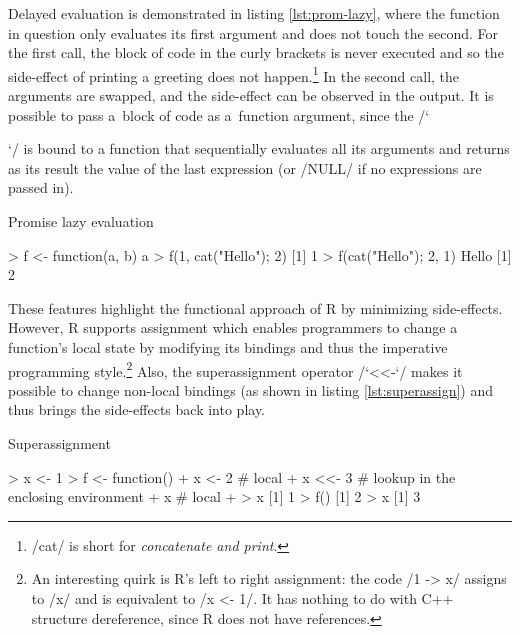 Delayed evaluation is demonstrated in listing \ref{lst:prom-lazy}, where the function in question only evaluates its first argument and does not touch the second. For the first call, the block of code in the curly brackets is never executed and so the side-effect of printing a greeting does not happen.\footnote{\rinline/cat/ is short for \emph{concatenate and print}.} In the second call, the arguments are swapped, and the side-effect can be observed in the output. It is possible to pass a~block of code as a~function argument, since the \rinline/`{`/ is bound to a function that sequentially evaluates all its arguments and returns as its result the value of the last expression (or \rinline/NULL/ if no expressions are passed in).

\begin{listing}[htbp]
  \caption{\label{lst:prom-lazy}Promise lazy evaluation}
  \begin{rcode}
> f <- function(a, b) a
> f(1, {cat("Hello\n"); 2})
[1] 1
> f({cat("Hello\n"); 2}, 1)
Hello
[1] 2
  \end{rcode}
\end{listing}

These features highlight the functional approach of R by minimizing side-effects. However, R supports assignment which enables programmers to change a function's local state by modifying its bindings and thus the imperative programming style.\footnote{An interesting quirk is R's left to right assignment: the code \rinline/1 -> x/ assigns to \rinline/x/ and is equivalent to \rinline/x <- 1/. It has nothing to do with C++ structure dereference, since R does not have references.} Also, the superassignment operator \rinline/`<<-`/ makes it possible to change non-local bindings (as shown in listing \ref{lst:superassign}) and thus brings the side-effects back into play.


\begin{listing}[htbp]
  \caption{\label{lst:superassign}Superassignment}
  \begin{rcode}
> x <- 1
> f <- function() {
+     x <- 2  # local
+     x <<- 3  # lookup in the enclosing environment
+     x  # local
+ }
> x
[1] 1
> f()
[1] 2
> x
[1] 3
  \end{rcode}
\end{listing}

}

